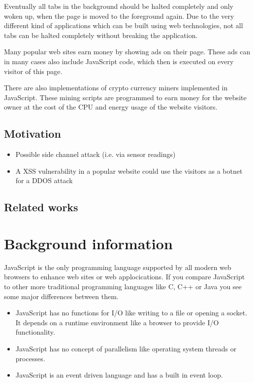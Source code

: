 \documentclass[article,type=bsc,colorback,accentcolor=tud9c]{tudthesis}
\begin{document}
  Eventually all tabs in the background should be halted completely and only woken up, when the page is moved to the foreground again. Due to the very different kind of applications which can be built using web technologies, not all tabs can be halted completely without breaking the application.

  Many popular web sites earn money by showing ads on their page. These ads can in many cases also include JavaScript code, which then is executed on every visitor of this page.

  There are also implementations of crypto currency miners implemented in JavaScript. These mining scripts are programmed to earn money for the website owner at the cost of the CPU and energy usage of the website visitors.
  
  \subsection{Motivation}

  \begin{itemize}
  \item Possible side channel attack (i.e. via sensor readings)
  \item A XSS vulnerability in a popular website could use the visitors as a botnet for a DDOS attack
  \end{itemize}

  \subsection{Related works}
  
  

  
  \newpage
  \section{Background information}

  JavaScript is the only programming language supported by all modern web browsers to enhance web sites or web applocications. If you compare JavaScript to other more traditional programming languages like C, C++ or Java you see some major differences between them.

  \begin{itemize}
  \item JavaScript has no functions for I/O like writing to a file or opening a socket. It depends on a runtime environment like a browser to provide I/O functionality.
  \item JavaScript has no concept of parallelism like operating system threads or processes.
  \item JavaScript is an event driven language and has a built in event loop.
  \end{itemize}
\end{document}
